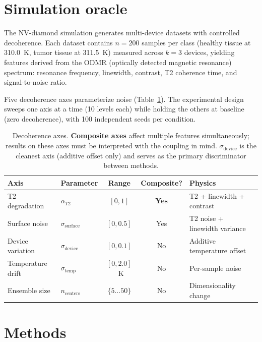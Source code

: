 \documentclass[11pt]{article}
\begin{document}
\section{Simulation oracle}
\label{sec:oracle}

The NV-diamond simulation generates multi-device datasets with controlled
decoherence.  Each dataset contains $n = 200$ samples per class (healthy
tissue at 310.0~K, tumor tissue at 311.5~K) measured across $k = 3$
devices, yielding features derived from the ODMR (optically detected
magnetic resonance) spectrum: resonance frequency, linewidth, contrast,
T2 coherence time, and signal-to-noise ratio.

Five decoherence axes parameterize noise (Table~\ref{tab:axes}).  The
experimental design sweeps one axis at a time (10 levels each) while
holding the others at baseline (zero decoherence), with 100 independent
seeds per condition.

\begin{table}[t]
\centering
\caption{Decoherence axes.  \textbf{Composite axes} affect multiple
  features simultaneously; results on these axes must be interpreted
  with the coupling in mind.  $\sigma_\text{device}$ is the cleanest axis
  (additive offset only) and serves as the primary discriminator
  between methods.}
\label{tab:axes}
\begin{tabular}{@{}llccl@{}}
\toprule
Axis & Parameter & Range & Composite? & Physics \\
\midrule
T2 degradation & $\alpha_{T2}$ & $[0, 1]$ & \textbf{Yes} & T2 + linewidth + contrast \\
Surface noise & $\sigma_\text{surface}$ & $[0, 0.5]$ & Yes & T2 noise + linewidth variance \\
Device variation & $\sigma_\text{device}$ & $[0, 0.1]$ & No & Additive temperature offset \\
Temperature drift & $\sigma_\text{temp}$ & $[0, 2.0]$~K & No & Per-sample noise \\
Ensemble size & $n_\text{centers}$ & $\{5 \ldots 50\}$ & No & Dimensionality change \\
\bottomrule
\end{tabular}
\end{table}

\section{Methods}
\label{sec:methods}
\end{document}
